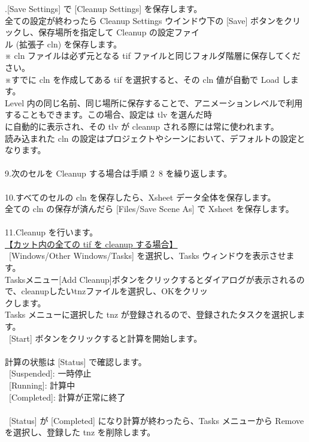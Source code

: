 \documentclass[a4paper,10pt]{article}
\begin{document}
.[Save Settings] で [Cleanup Settings] を保存します。\\
\footnotesize
全ての設定が終わったら Cleanup Settings ウインドウ下の [Save] ボタンをクリックし、保存場所を指定して Cleanup の設定ファイ\\
ル (拡張子 cln) を保存します。\\
※ cln ファイルは必ず元となる tif ファイルと同じフォルダ階層に保存してください。\\
※すでに cln を作成してある tif を選択すると、その cln 値が自動で Load します。\\
Level 内の同じ名前、同じ場所に保存することで、アニメーションレベルで利用することもできます。この場合、設定は tlv を選んだ時\\
に自動的に表示され、その tlv が cleanup される際には常に使われます。\\
読み込まれた cln の設定はプロジェクトやシーンにおいて、デフォルトの設定となります。\\
\\
\small
9.次のセルを Cleanup する場合は手順 2~8 を繰り返します。\\
\\
10.すべてのセルの cln を保存したら、Xsheet データ全体を保存します。\\
\footnotesize
全ての cln の保存が済んだら [Files/Save Scene As] で Xsheet を保存します。\\
\\
\small
11.Cleanup を行います。\\
\footnotesize
\uline{【カット内の全ての tif を cleanup する場合】}\\
\ [Windows/Other Windows/Tasks] を選択し、Tasks ウィンドウを表示させます。\\
Tasksメニュー[Add Cleanup]ボタンをクリックするとダイアログが表示されるので、cleanupしたいtnzファイルを選択し、OKをクリッ\\
クします。\\
Tasks メニューに選択した tnz が登録されるので、登録されたタスクを選択します。\\
\ [Start] ボタンをクリックすると計算を開始します。\\
\\
計算の状態は [Status] で確認します。\\
\ [Suspended]: 一時停止\\
\ [Running]: 計算中\\
\ [Completed]: 計算が正常に終了\\
\\
\ [Status] が [Completed] になり計算が終わったら、Tasks メニューから Remove を選択し、登録した tnz を削除します。\\
\end{document}
